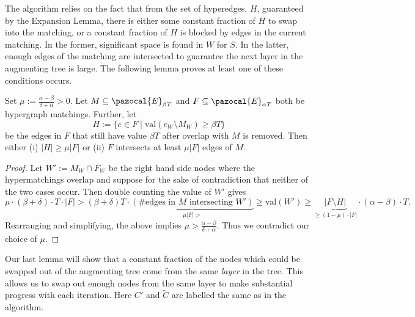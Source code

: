 The algorithm relies on the fact that from the set of hyperedges, $H$,
guaranteed by the Expansion Lemma,
there is either some constant fraction of $H$ to swap into the matching, 
or a constant fraction of $H$ is blocked by edges in the current matching. 
In the former, significant space is found in $W$ for $S$. 
In the latter, enough edges of the matching are intersected to guarantee the next layer in the augmenting tree is large.
The following lemma proves at least one of these conditions occurs. 

\begin{lemma} \label{lem:SizeOfOverlapOfNewEdgesWithM}
Set $\mu := \frac{\alpha - \beta}{\delta + \alpha} > 0$.
Let $M \subseteq \pazocal{E}_{\beta T}$ and $F \subseteq \pazocal{E}_{\alpha T}$ both be hypergraph matchings. Further,
let 
\[
    H := \{  e \in F \mid \text{val}(e_W \setminus M_W) \geq \beta T\}
\]
  be the edges in $F$ that still have value $\beta T$ after overlap with $M$ is removed.
  Then either (i) $|H| \geq \mu |F|$ or (ii) $F$ intersects at least $\mu |F|$ edges of $M$.
  \end{lemma}
  \begin{proof}
  Let $W' := M_W \cap F_W$ be the right hand side nodes where the hypermatchings overlap and 
  suppose for the sake of contradiction that neither of the two cases occur. Then
  double counting the value of $W'$ gives
  \[
  \mu \cdot (\beta +\delta)\cdot T \cdot |F| > (\beta+ \delta) T \cdot \underbrace{(\#\textrm{edges in }M\textrm{ intersecting }W')}_{\mu |F| >} 
  \geq \text{val}(W')\geq \underbrace{|F \setminus H|}_{\geq (1-\mu) \cdot |F|} \cdot (\alpha-\beta) \cdot T.
  \]
  Rearranging and simplifying, the above implies $\mu > \frac{\alpha - \beta}{\delta + \alpha}$. Thus we contradict our choice of $\mu$.
  \end{proof}




Our last lemma will show that a constant fraction of the nodes
 which could be swapped out of the augmenting tree come from the same \textit{layer} in the tree. 
 This allows us to swap out enough nodes from the same layer to make substantial progress with each iteration. 
 Here $C'$ and $\tilde{C}$ are labelled the same as in the algorithm.


